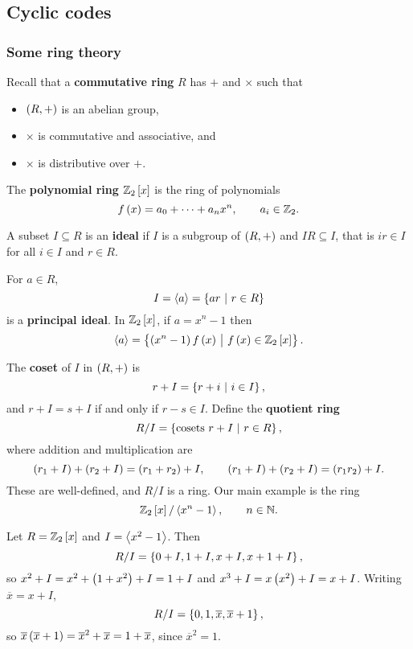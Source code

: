 \subsection{Cyclic codes}

\subsubsection{Some ring theory}

Recall that a \textbf{commutative ring} $ R $ has $ + $ and $ \times $ such that
\begin{itemize}
\item $ \br{R, +} $ is an abelian group,
\item $ \times $ is commutative and associative, and
\item $ \times $ is distributive over $ + $.
\end{itemize}

\begin{example*}
The \textbf{polynomial ring} $ \ZZ_2\sbr{x} $ is the ring of polynomials
$$ f\br{x} = a_0 + \dots + a_nx^n, \qquad a_i \in \ZZ_2. $$
\end{example*}

A subset $ I \subseteq R $ is an \textbf{ideal} if $ I $ is a subgroup of $ \br{R, +} $ and $ IR \subseteq I $, that is $ ir \in I $ for all $ i \in I $ and $ r \in R $.

\begin{example*}
For $ a \in R $,
$$ I = \abr{a} = \cbr{ar \st r \in R} $$
is a \textbf{principal ideal}. In $ \ZZ_2\sbr{x} $, if $ a = x^n - 1 $ then
$$ \abr{a} = \cbr{\br{x^n - 1}f\br{x} \st f\br{x} \in \ZZ_2\sbr{x}}. $$
\end{example*}

The \textbf{coset} of $ I $ in $ \br{R, +} $ is
$$ r + I = \cbr{r + i \st i \in I}, $$
and $ r + I = s + I $ if and only if $ r - s \in I $. Define the \textbf{quotient ring}
$$ R / I = \cbr{\text{cosets} \ r + I \st r \in R}, $$
where addition and multiplication are
$$ \br{r_1 + I} + \br{r_2 + I} = \br{r_1 + r_2} + I, \qquad \br{r_1 + I} + \br{r_2 + I} = \br{r_1r_2} + I. $$
These are well-defined, and $ R / I $ is a ring. Our main example is the ring
$$ \ZZ_2\sbr{x} / \abr{x^n - 1}, \qquad n \in \NN. $$

\pagebreak

\begin{example*}
Let $ R = \ZZ_2\sbr{x} $ and $ I = \left\langle x^2 - 1 \right\rangle $. Then
$$ R / I = \cbr{0 + I, 1 + I, x + I, x + 1 + I}, $$
so $ x^2 + I = x^2 + \br{1 + x^2} + I = 1 + I $ and $ x^3 + I = x\br{x^2} + I = x + I $. Writing $ \overline{x} = x + I $,
$$ R / I = \cbr{0, 1, \overline{x}, \overline{x} + 1}, $$
so $ \overline{x}\br{\overline{x} + 1} = \overline{x}^2 + \overline{x} = 1 + \overline{x} $, since $ \overline{x}^2 = 1 $.
\end{example*}

